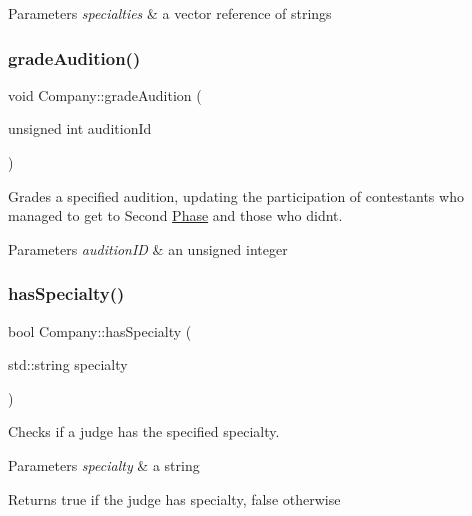 \begin{DoxyParams}{Parameters}
{\em specialties} & a vector reference of strings \\
\hline
\end{DoxyParams}
\mbox{\label{class_company_a56268c11009ad2441a1dde545f7ceacf}} 
\subsubsection{\texorpdfstring{grade\+Audition()}{gradeAudition()}}
{\footnotesize\ttfamily void Company\+::grade\+Audition (\begin{DoxyParamCaption}\item[{unsigned int}]{audition\+Id }\end{DoxyParamCaption})}



Grades a specified audition, updating the participation of contestants who managed to get to Second \hyperlink{class_phase}{Phase} and those who didn\textquotesingle{}t. 


\begin{DoxyParams}{Parameters}
{\em audition\+ID} & an unsigned integer \\
\hline
\end{DoxyParams}
\mbox{\label{class_company_a3976d4ec91c9f9dfe1b777b4d7587684}} 
\subsubsection{\texorpdfstring{has\+Specialty()}{hasSpecialty()}}
{\footnotesize\ttfamily bool Company\+::has\+Specialty (\begin{DoxyParamCaption}\item[{std\+::string}]{specialty }\end{DoxyParamCaption})}



Checks if a judge has the specified specialty. 


\begin{DoxyParams}{Parameters}
{\em specialty} & a string \\
\hline
\end{DoxyParams}
\begin{DoxyReturn}{Returns}
true if the judge has specialty, false otherwise 
\end{DoxyReturn}
\mbox{\label{class_company_a65a8b53db0f81846a91709108f4e36fa}} 
